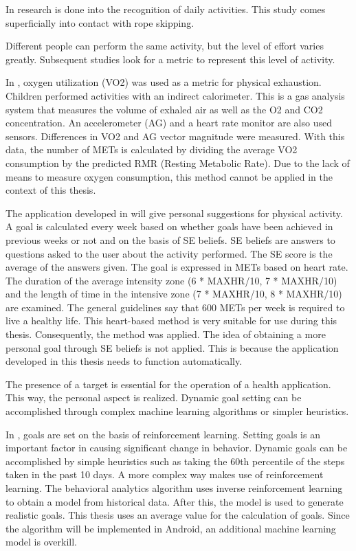 \documentclass[twocolumn]{phdsymp} %
\begin{document}
In  \cite{ref53} research is done into the recognition of daily activities. This study comes superficially into contact with rope skipping.

Different people can perform the same activity, but the level of effort varies greatly. Subsequent studies look for a metric to represent this level of activity.

In \cite{ref18}, oxygen utilization (VO2) was used as a metric for physical exhaustion. Children performed activities with an indirect calorimeter. This is a gas analysis system that measures the volume of exhaled air as well as the O2 and CO2 concentration. An accelerometer (AG) and a heart rate monitor are also used sensors. Differences in VO2 and AG vector magnitude were measured.
With this data, the number of METs is calculated by dividing the average VO2 consumption by the predicted RMR (Resting Metabolic Rate).
Due to the lack of means to measure oxygen consumption, this method cannot be applied in the context of this thesis.

The application developed in \cite{ref21} will give personal suggestions for physical activity. A goal is calculated every week based on whether goals have been achieved in previous weeks or not and on the basis of SE beliefs. SE beliefs are answers to questions asked to the user about the activity performed. The SE score is the average of the answers given. The goal is expressed in METs based on heart rate. The duration of the average intensity zone (6 * MAXHR/10, 7 * MAXHR/10) and the length of time in the intensive zone (7 * MAXHR/10, 8 * MAXHR/10) are examined. The general guidelines say that 600 METs per week is required to live a healthy life. This heart-based method is very suitable for use during this thesis. Consequently, the method was applied. The idea of obtaining a more personal goal through SE beliefs is not applied. This is because the application developed in this thesis needs to function automatically.

The presence of a target is essential for the operation of a health application. This way, the personal aspect is realized.
Dynamic goal setting can be accomplished through complex machine learning algorithms or simpler heuristics. 

In \cite{ref11}, goals are set on the basis of reinforcement learning. Setting goals is an important factor in causing significant change in behavior. Dynamic goals can be accomplished by simple heuristics such as taking the 60th percentile of the steps taken in the past 10 days. A more complex way makes use of reinforcement learning. The behavioral analytics algorithm uses inverse reinforcement learning to obtain a model from historical data. After this, the model is used to generate realistic goals.
This thesis uses an average value for the calculation of goals. Since the algorithm will be implemented in Android, an additional machine learning model is overkill.
\end{document}
